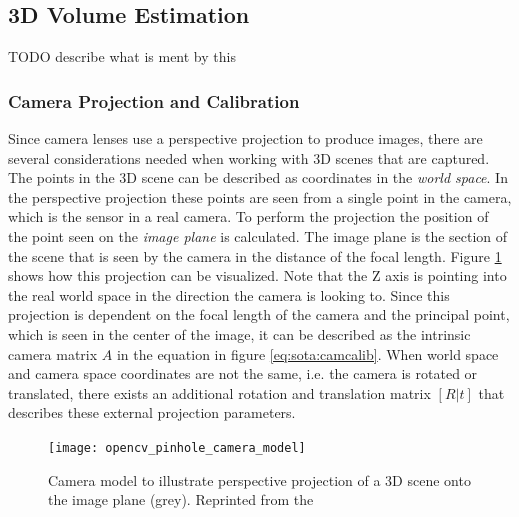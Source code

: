 \subsection{3D Volume Estimation}

TODO describe what is ment by this

\subsubsection{Camera Projection and Calibration}

Since camera lenses use a perspective projection to produce images, 
there are several considerations needed when working with \ac{3D} scenes that are captured.
The points in the 3D scene can be described as coordinates in the \emph{world space}.
In the perspective projection these points are seen from a single point in the camera, 
which is the sensor in a real camera.
To perform the projection the position of the point seen on the \emph{image plane} is calculated.
The image plane is the section of the scene that is seen by the camera in the distance of the focal length.
Figure \ref{fig:sota:camerprojection} shows how this projection can be visualized.
Note that the Z axis is pointing into the real world space in the direction the camera is looking to.
Since this projection is dependent on the focal length of the camera and the principal point, which is seen in the center of the image, it can be described as the intrinsic camera matrix $ A $ in the equation in figure \ref{eq:sota:camcalib}.
When world space and camera space coordinates are not the same, i.e. the camera is rotated or translated, there exists an additional rotation and translation matrix $ [R|t] $ that describes these external projection parameters.

\begin{figure}[hbt]
    \centering
    \texttt{[image: opencv\_pinhole\_camera\_model]}
        \caption[Camera model to illustrate perspective projection]{Camera model to illustrate perspective projection of a 3D scene onto the image plane (grey). Reprinted from the \textcite{opencv2018calibration}}
    \label{fig:sota:camerprojection}
\end{figure}

